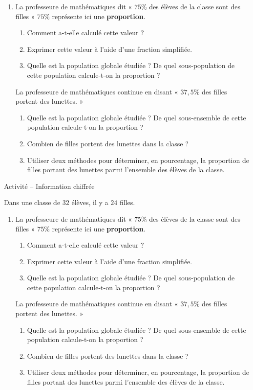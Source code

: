 \documentclass[11pt]{article}
\begin{document}
\begin{enumerate}
  \item La professeure de mathématiques dit « $75$\% des élèves de la classe
    sont des filles » $75\%$ représente ici une \textbf{proportion}.
    \begin{enumerate}
      \item Comment a-t-elle calculé cette valeur ?
      \item Exprimer cette valeur à l'aide d'une fraction simplifiée.
      \item Quelle est la population globale étudiée ? De quel sous-population
        de cette population calcule-t-on la proportion ?
    \end{enumerate}
    La professeure de mathématiques continue en disant « $37,5\%$ des filles
    portent des lunettes. »
    \begin{enumerate}
      \item Quelle est la population globale étudiée ? De quel sous-ensemble de
        cette population calcule-t-on la proportion ?
      \item Combien de filles portent des lunettes dans la classe ?
      \item Utiliser deux méthodes pour déterminer, en pourcentage, la
        proportion de filles portant des lunettes parmi l'ensemble des élèves de
        la classe.
    \end{enumerate}
\end{enumerate}
\vspace{1cm}
\begin{center}
  \LARGE Activité -- Information chiffrée
\end{center}
Dans une classe de $32$ élèves, il y a $24$ filles.
\begin{enumerate}
  \item La professeure de mathématiques dit « $75$\% des élèves de la classe
    sont des filles » $75\%$ représente ici une \textbf{proportion}.
    \begin{enumerate}
      \item Comment a-t-elle calculé cette valeur ?
      \item Exprimer cette valeur à l'aide d'une fraction simplifiée.
      \item Quelle est la population globale étudiée ? De quel sous-population
        de cette population calcule-t-on la proportion ?
    \end{enumerate}
    La professeure de mathématiques continue en disant « $37,5\%$ des filles
    portent des lunettes. »
    \begin{enumerate}
      \item Quelle est la population globale étudiée ? De quel sous-ensemble de
        cette population calcule-t-on la proportion ?
      \item Combien de filles portent des lunettes dans la classe ?
      \item Utiliser deux méthodes pour déterminer, en pourcentage, la
        proportion de filles portant des lunettes parmi l'ensemble des élèves de
        la classe.
    \end{enumerate}
\end{enumerate}
\end{document}
